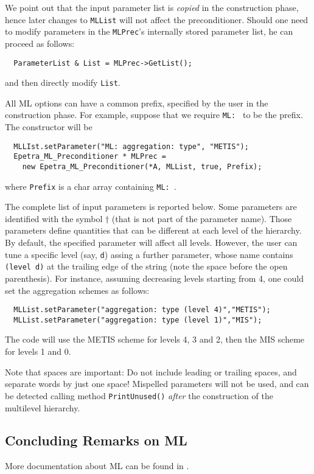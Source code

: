 We point out that the input parameter list is {\sl copied} in the
construction phase, hence later changes to \verb!MLList! will not affect
the preconditioner. Should one need to modify parameters in the
\verb!MLPrec!'s internally stored parameter list, he can proceed as
follows:
\begin{verbatim}
  ParameterList & List = MLPrec->GetList();
\end{verbatim}
and then directly modify \verb!List!.

\medskip

All ML options can have a common prefix, specified by the
user in the construction phase. For example, suppose that we require
\verb!ML: ! to be the prefix. The constructor will be
\begin{verbatim}
  MLLIst.setParameter("ML: aggregation: type", "METIS");
  Epetra_ML_Preconditioner * MLPrec = 
    new Epetra_ML_Preconditioner(*A, MLList, true, Prefix);
\end{verbatim}
where \verb!Prefix! is a char array containing \verb!ML: !.

The complete list of input parameters is reported below. Some parameters
are identified with the symbol $\dagger$ (that is not part of the
parameter name). Those parameters define quantities that can be
different at each level of the hierarchy. By default, the specified
parameter will affect all levels. However, the user can tune a specific
level (say, \verb!d!) assing a further parameter, whose name contains
\verb! (level d)! at the trailing edge of the string (note the space
before the open parenthesis). For instance,  assuming
decreasing levels starting from 4, one could set the aggregation schemes
as follows:
\begin{verbatim}
  MLList.setParameter("aggregation: type (level 4)","METIS");
  MLList.setParameter("aggregation: type (level 1)","MIS");
\end{verbatim}
The code will use the METIS scheme for levels 4, 3 and 2, then the MIS
scheme for levels 1 and 0.

Note that spaces are important: Do not include leading or trailing
spaces, and separate words by just one space! Mispelled parameters will
not be used, and can be detected calling method \verb!PrintUnused()!
{\sl after} the construction of the multilevel hierarchy. 


\subsection{Concluding Remarks on ML}
\label{sec:ml_concluding}

More documentation about ML can be found in
\cite{ML-home-page,TuminaroTong:00,TuminaroTong:00}.

